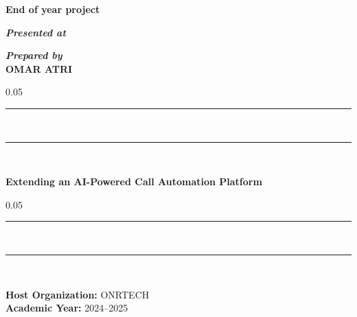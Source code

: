 \documentclass[12pt,a4paper]{report}
\begin{document}
\begin{titlepage}
\begin{center}
\vspace{25pt} 
{%
  \fontsize{36pt}{36pt}\selectfont%
  \textbf{End of year project}\\%
}

\vspace{44pt}%
\textbf{\textit{Presented at}}\\


\vspace{35pt}
\textbf{\textit{Prepared by}}\\%
\vspace{10pt} {%
  \fontsize{18pt}{18pt}\selectfont%
  \textbf{OMAR ATRI}\\%
}%

\vspace{25pt} {%
  \begin{spacing}{0.05}
    \rule{200pt}{2pt}\\
    \rule{200pt}{0.75pt}\\
  \end{spacing}
  \fontsize{15pt}{15pt}\selectfont%
  \vspace{20pt}
  \textbf{
  Extending an AI-Powered Call Automation Platform
  }
  \vspace{10pt}
  \begin{spacing}{0.05}
    \rule{200pt}{0.75pt}\\
    \rule{200pt}{2pt}\\
  \end{spacing}
}

\vspace{35pt}
\textbf{Host Organization:} ONRTECH\\%

\vspace{80pt}
\textbf{Academic Year:} 2024--2025


\end{center}
\end{titlepage}
\end{document}
